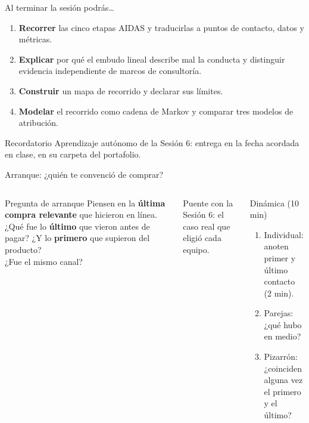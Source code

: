 \documentclass[aspectratio=169,xcolor=dvipsnames]{beamer}
\begin{document}
\begin{frame}{Al terminar la sesión podrás\ldots}
\begin{enumerate}
  \item \textbf{Recorrer} las cinco etapas AIDAS y traducirlas a puntos de contacto, datos y métricas.
  \vspace{4pt}
  \item \textbf{Explicar} por qué el embudo lineal describe mal la conducta y distinguir evidencia independiente de marcos de consultoría.
  \vspace{4pt}
  \item \textbf{Construir} un mapa de recorrido y declarar sus límites.
  \vspace{4pt}
  \item \textbf{Modelar} el recorrido como cadena de Markov y comparar tres modelos de atribución.
\end{enumerate}
\vspace{6pt}
\begin{alertblock}{Recordatorio}
  Aprendizaje autónomo de la Sesión 6: entrega en la fecha acordada en clase, en su carpeta del portafolio.
\end{alertblock}
\end{frame}

\begin{frame}{Arranque: ¿quién te convenció de comprar?}
\begin{columns}[T]
  \begin{exampleblock}{Pregunta de arranque}
    Piensen en la \textbf{última compra relevante} que hicieron en línea. ¿Qué fue lo \textbf{último} que vieron antes de pagar? ¿Y lo \textbf{primero} que supieron del producto?\\[4pt]
    ¿Fue el mismo canal?
  \end{exampleblock}
  \vspace{4pt}
  {\small\color{IPNgris} Puente con la Sesión 6: el caso real que eligió cada equipo.}
  \begin{block}{Dinámica (10 min)}
    \small
    \begin{enumerate}
      \item Individual: anoten primer y último contacto (2 min).
      \item Parejas: ¿qué hubo en medio?
      \item Pizarrón: ¿coinciden alguna vez el primero y el último?
    \end{enumerate}
  \end{block}
\end{columns}
\end{frame}
\end{document}
